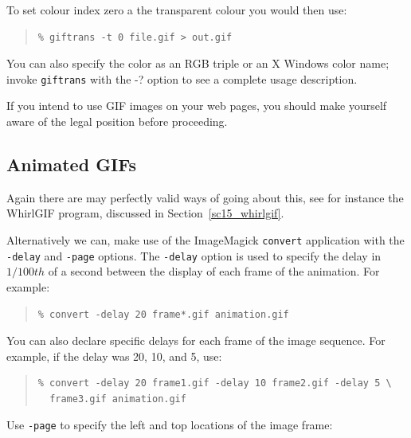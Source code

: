 \documentclass[twoside,11pt]{article}
\newcommand{\htmlref}[2]{#1}
\newcommand{\latex}[1]{#1}
\newcommand{\xlabel}[1]{}
\begin{document}
To set colour index zero a the transparent colour you would then use:

\small
\begin{quote}
\begin{verbatim}
% giftrans -t 0 file.gif > out.gif
\end{verbatim}
\end{quote}
\normalsize

You can also specify the color as an RGB triple or an X Windows color
name; invoke {\tt giftrans} with the -? option to see a complete usage
description. 

If you intend to use GIF images on your web pages, you should make
yourself aware of the \htmlref{legal position}{sc15_giflegal} before
proceeding. 

\subsection{\xlabel{sc15_animated}Animated GIFs\label{sc15_animated}}

Again there are may perfectly valid ways of going about this, see for
instance the \htmlref{WhirlGIF}{sc15_whirlgif} program\latex{,
discussed in Section~\ref{sc15_whirlgif}}.

Alternatively we can, make use of the
\htmlref{ImageMagick}{sc15_magick} {\tt convert} application with the
{\tt -delay} and {\tt -page} options. The {\tt -delay} option is used
to specify the delay in $1/100 th$ of a second between the display of
each frame of the animation. For example:

\small
\begin{quote}
\begin{verbatim}
% convert -delay 20 frame*.gif animation.gif
\end{verbatim}
\end{quote}
\normalsize

You can also declare specific delays for each frame of the image
sequence. For example, if the delay was 20, 10, and 5, use:

\small
\begin{quote}
\begin{verbatim}
% convert -delay 20 frame1.gif -delay 10 frame2.gif -delay 5 \
  frame3.gif animation.gif
\end{verbatim}
\end{quote}
\normalsize

Use {\tt -page} to specify the left and top locations of the image frame: 
\end{document}
